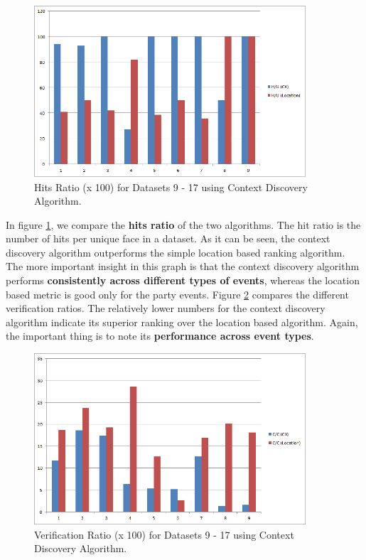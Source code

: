\begin{figure}[h]
\centering
\includegraphics[width=0.9\textwidth]{media/chapter5/hits-ratio-comparison.png}
\caption{Hits Ratio (x 100) for Datasets 9 - 17 using Context Discovery Algorithm.}
\label{fig:hits-ratio-comparison}
\end{figure}

In figure \ref{fig:hits-ratio-comparison}, we compare the \textbf{hits ratio} of the two algorithms. The hit ratio is the number of hits per unique face in a dataset. As it can be seen, the context discovery algorithm outperforms the simple location based ranking algorithm. The more important insight in this graph is that the context discovery algorithm performs \textbf{consistently across different types of events}, whereas the location based metric is good only for the party events. Figure \ref{fig:verification-ratio-comparison} compares the different verification ratios. The relatively lower numbers for the context discovery algorithm indicate its superior ranking over the location based algorithm. Again, the important thing is to note its \textbf{performance across event types}. 

\begin{figure}[t]
\centering
\includegraphics[width=0.9\textwidth]{media/chapter5/verification-ratio-comparison.png}
\caption{Verification Ratio (x 100) for Datasets 9 - 17 using Context Discovery Algorithm.}
\label{fig:verification-ratio-comparison}
\end{figure}

